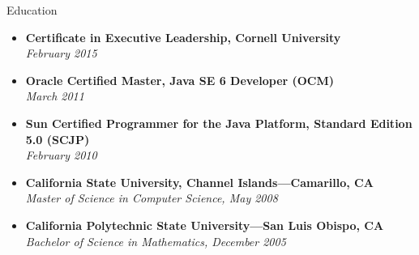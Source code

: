 \documentclass[11pt,oneside]{article}
\newenvironment{ressection}[1]{
	\vspace{4pt}
	{\fontfamily{phv}\selectfont\Large#1}
	\begin{itemize}[label={--}]
	\vspace{3pt}
}{
	\end{itemize}
}
\newcommand{\ressubitem}[1]{
	\vspace{-1pt}
	\item \begin{flushleft} #1 \end{flushleft}
}
\newcommand{\simplebigitem}[2]{
	\vspace{-5pt}
	\item
	\textbf{#1} \\
	\textit{#2}
}
\newenvironment{simplesubsec}[2]{
	\simplebigitem{#1}{#2}
	\vspace{-2pt}

}{

}
\begin{document}
\begin{ressection}{Education}



	\begin{simplesubsec}{Certificate in Executive Leadership, Cornell University}{February 2015}
	\end{simplesubsec}

	\begin{simplesubsec}{Oracle Certified Master, Java SE 6 Developer (OCM)}{March 2011}
	\end{simplesubsec}
	\begin{simplesubsec}{Sun Certified Programmer for the Java Platform, Standard Edition 5.0 (SCJP)}{February 2010}
	\end{simplesubsec}



	\begin{simplesubsec}{California State University, Channel Islands---Camarillo, CA}{Master of Science in Computer Science, May 2008}
	\end{simplesubsec}



	\begin{simplesubsec}{California Polytechnic State University---San Luis Obispo, CA}{Bachelor of Science in Mathematics, December 2005}
	\end{simplesubsec}

\end{ressection}
\end{document}
